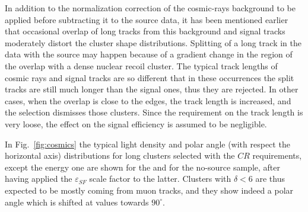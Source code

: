 In addition to the normalization correction of the cosmic-rays
background to be applied before subtracting it to the source data, it
has been mentioned earlier that occasional overlap of long tracks from
this background and signal tracks moderately distort the cluster shape
distributions. Splitting of a long track in the data with the source
may happen because of a gradient change in the region of the overlap
with a dense nuclear recoil cluster. The typical track lengths of
cosmic rays and signal tracks are so different that in these
occurrences the split tracks are still much longer than the signal
ones, thus they are rejected.  In other cases, when the overlap is
close to the edges, the track length is increased, and the selection
dismisses those clusters.  Since the requirement on the track length
is very loose, the effect on the signal efficiency is assumed to be
negligible.

In Fig.~\ref{fig:cosmics} the typical light density and polar angle
(with respect the horizontal axis) distributions for long clusters
selected with the $CR$ requirements, except the energy one are shown
for the \ambe and for the no-source sample, after having applied the
$\varepsilon_{SF}$ scale factor to the latter.  Clusters with
$\delta<6$ are thus expected to be mostly coming from muon tracks, and
they show indeed a polar angle which is shifted at values towards
$90^\circ$.



